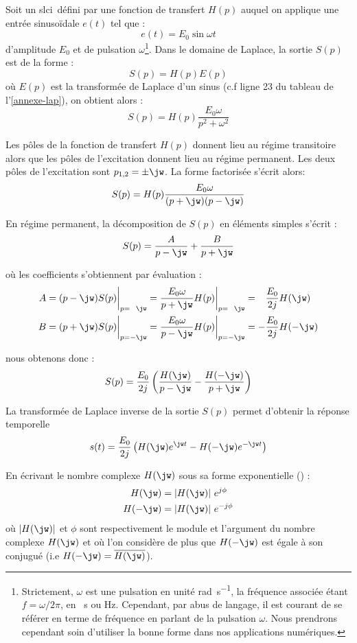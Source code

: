 
Soit un \gls{slci}~défini par une fonction de transfert $H(p)$ auquel on 
applique une entrée sinuso\"idale $e(t)$ tel que :
$$
e(t)=E_0\sin\omega t 
$$
d'amplitude $E_0$ et de pulsation $\omega$\footnote{Strictement, $\omega$ est 
une pulsation en unité \si{\radian\per\second}, la fréquence associée étant 
$f=\omega/2\pi$, en \si{\per\second} ou \si{\hertz}. Cependant, par abus de 
langage, il est courant de se référer en terme de fréquence en parlant de la 
pulsation $\omega$. Nous prendrons cependant soin d'utiliser la bonne forme 
dans nos applications numériques.}. Dans le domaine de Laplace, la sortie $S(p)$
est de la forme :
$$
S(p)=H(p)E(p)
$$
où $E(p)$ est la transformée de Laplace d'un sinus (c.f ligne 23 du tableau de 
l'\cref{annexe-lap}), on obtient alors :
$$
S(p)=H(p)\dfrac{E_0\omega}{p^2+\omega^2}
$$

Les pôles de la fonction de transfert $H(p)$ donnent lieu au 
régime transitoire alors que les pôles de l'excitation donnent 
lieu au régime permanent. 
Les deux pôles de l'excitation sont $p_{1,2}=\pm\jw$. La forme factorisée 
s'écrit alors:
$$
S(p)=H(p)\dfrac{E_0\omega}{(p+\jw)(p-\jw)}
$$

En régime permanent, la décomposition de $S(p)$ en éléments simples s'écrit :
$$
S(p)=\dfrac{A}{p-\jw} + \dfrac{B}{p+\jw}
$$

où les coefficients s'obtiennent par évaluation :
\begin{align*}
    A&=(p-\jw)S(p)\bigg|_{p=\hphantom{-}\jw}=
       \dfrac{E_0\omega}{p+\jw}H(p)\bigg|_{p=\hphantom{-}\jw}=
       \hphantom{-}\dfrac{E_0}{2j}H(\jw)\\
    B&=(p+\jw)S(p)\bigg|_{p=-\jw}=
       \dfrac{E_0\omega}{p-\jw}H(p)\bigg|_{p=-\jw}=
       -\dfrac{E_0}{2j}H(-\jw)
\end{align*}

nous obtenons donc :
$$
S(p)=\dfrac{E_0}{2j}\left(\dfrac{H(\jw)}{p-\jw}-\dfrac{H(-\jw)}{p+\jw} \right)
$$

La transformée de Laplace inverse de la sortie $S(p)$ permet d'obtenir la 
réponse temporelle 
$$
s(t)=\dfrac{E_0}{2j}\left(H(\jw)e^{\jw t}-H(-\jw)e^{-\jw t}\right)
$$

En écrivant le nombre complexe $H(\jw)$ sous sa forme exponentielle 
() :
\begin{align*}
    H(\jw)  &= |H(\jw)| e^{j\phi} \\
    H(-\jw) &= |H(\jw)| e^{-j\phi}
\end{align*}
où $|H(\jw)|$ et $\phi$ sont respectivement le module et l'argument du nombre
complexe $H(\jw)$ 
et où l'on considère de plus que $H(-\jw)$ est égale à son conjugué (i.e 
$H(-\jw)=\overline{H(\jw)}$).

